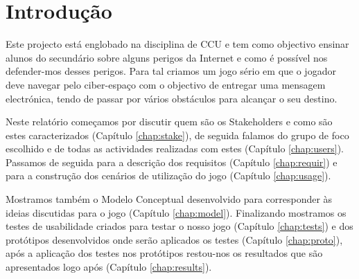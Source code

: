 \chapter{Introdução}
\label{chap:intro} 
Este projecto está englobado na disciplina de \ac{CCU} e tem como objectivo ensinar alunos do secundário sobre alguns perigos da Internet e como é possível nos defender-mos desses perigos.
Para tal criamos um jogo sério em que o jogador deve navegar pelo ciber-espaço com o objectivo de entregar uma mensagem electrónica, tendo de passar por vários obstáculos para alcançar o seu destino.

Neste relatório começamos por discutir quem são os Stakeholders e como são estes caracterizados (Capítulo \ref{chap:stake}), de seguida falamos do grupo de foco escolhido e de todas as actividades realizadas com estes (Capítulo \ref{chap:users}).
Passamos de seguida para a descrição dos requisitos (Capítulo \ref{chap:requir}) e para a construção dos cenários de utilização do jogo (Capítulo \ref{chap:usage}).

Mostramos também o Modelo Conceptual desenvolvido para corresponder às ideias discutidas para o jogo (Capítulo \ref{chap:model}).
Finalizando mostramos os testes de usabilidade criados para testar o nosso jogo (Capítulo \ref{chap:tests}) e dos protótipos desenvolvidos onde serão aplicados os testes (Capítulo \ref{chap:proto}), após a aplicação dos testes nos protótipos restou-nos os resultados que são apresentados logo após (Capítulo \ref{chap:results}).
